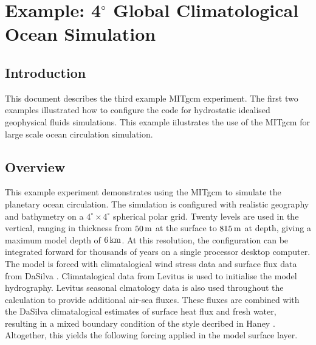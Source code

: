 
\section{Example: 4$^\circ$ Global Climatological Ocean Simulation}


%
%

\subsection{Introduction}

This document describes the third example MITgcm experiment. The first
two examples illustrated how to configure the code for hydrostatic idealised
geophysical fluids simulations. This example iilustrates the use of
the MITgcm for large scale ocean circulation simulation.

\subsection{Overview}

This example experiment demonstrates using the MITgcm to simulate
the planetary ocean circulation. The simulation is configured
with realistic geography and bathymetry on a
$4^{\circ} \times 4^{\circ}$ spherical polar grid.
Twenty levels are used in the vertical, ranging in thickness
from $50\,{\rm m}$ at the surface to $815\,{\rm m}$ at depth,
giving a maximum model depth of $6\,{\rm km}$.
At this resolution, the configuration
can be integrated forward for thousands of years on a single 
processor desktop computer.
\\

The model is forced with climatalogical wind stress data and surface
flux data from DaSilva \cite{DaSilva94}. Climatalogical data
from Levitus \cite{Levitus94} is used to initialise the model hydrography.
Levitus seasonal clmatology data is also used throughout the calculation
to provide additional air-sea fluxes.
These fluxes are combined with the DaSilva climatalogical estimates of
surface heat flux and fresh water, resulting in a mixed boundary
condition of the style decribed in Haney \cite{Haney}.
Altogether, this yields the following forcing applied
in the model surface layer.

